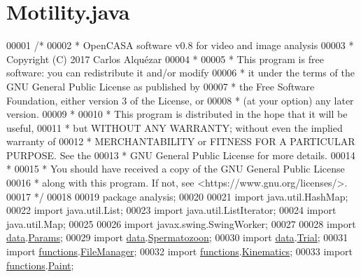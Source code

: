 \hypertarget{_motility_8java_source}{}\section{Motility.\+java}
\label{_motility_8java_source}

\begin{DoxyCode}
00001 \textcolor{comment}{/*}
00002 \textcolor{comment}{ *   OpenCASA software v0.8 for video and image analysis}
00003 \textcolor{comment}{ *   Copyright (C) 2017  Carlos Alquézar}
00004 \textcolor{comment}{ *}
00005 \textcolor{comment}{ *   This program is free software: you can redistribute it and/or modify}
00006 \textcolor{comment}{ *   it under the terms of the GNU General Public License as published by}
00007 \textcolor{comment}{ *   the Free Software Foundation, either version 3 of the License, or}
00008 \textcolor{comment}{ *   (at your option) any later version.}
00009 \textcolor{comment}{ *}
00010 \textcolor{comment}{ *   This program is distributed in the hope that it will be useful,}
00011 \textcolor{comment}{ *   but WITHOUT ANY WARRANTY; without even the implied warranty of}
00012 \textcolor{comment}{ *   MERCHANTABILITY or FITNESS FOR A PARTICULAR PURPOSE.  See the}
00013 \textcolor{comment}{ *   GNU General Public License for more details.}
00014 \textcolor{comment}{ *}
00015 \textcolor{comment}{ *   You should have received a copy of the GNU General Public License}
00016 \textcolor{comment}{ *   along with this program.  If not, see <https://www.gnu.org/licenses/>.}
00017 \textcolor{comment}{*/}      
00018 
00019 \textcolor{keyword}{package }analysis;
00020 
00021 \textcolor{keyword}{import} java.util.HashMap;
00022 \textcolor{keyword}{import} java.util.List;
00023 \textcolor{keyword}{import} java.util.ListIterator;
00024 \textcolor{keyword}{import} java.util.Map;
00025 
00026 \textcolor{keyword}{import} javax.swing.SwingWorker;
00027 
00028 \textcolor{keyword}{import} \hyperlink{namespacedata}{data}.\hyperlink{classdata_1_1_params}{Params};
00029 \textcolor{keyword}{import} \hyperlink{namespacedata}{data}.\hyperlink{classdata_1_1_spermatozoon}{Spermatozoon};
00030 \textcolor{keyword}{import} \hyperlink{namespacedata}{data}.\hyperlink{classdata_1_1_trial}{Trial};
00031 \textcolor{keyword}{import} \hyperlink{namespacefunctions}{functions}.\hyperlink{classfunctions_1_1_file_manager}{FileManager};
00032 \textcolor{keyword}{import} \hyperlink{namespacefunctions}{functions}.\hyperlink{classfunctions_1_1_kinematics}{Kinematics};
00033 \textcolor{keyword}{import} \hyperlink{namespacefunctions}{functions}.\hyperlink{classfunctions_1_1_paint}{Paint};

\end{DoxyCode}
